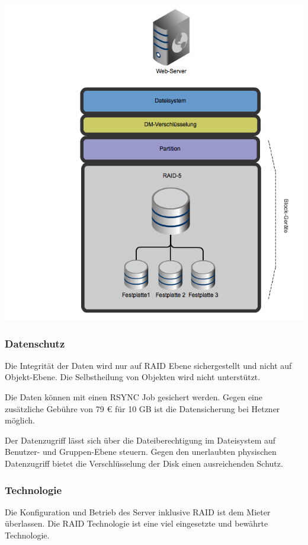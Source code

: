 \begin{center}
\includegraphics[width=\linewidth, keepaspectratio = true]{media/HetznerRAID.png}
\end{center}

\subsubsection*{Datenschutz}
Die Integrität der Daten wird nur auf RAID Ebene sichergestellt und nicht auf Objekt-Ebene. Die Selbstheilung von Objekten wird nicht unterstützt.

Die Daten können mit einen RSYNC Job gesichert werden. Gegen eine zusätzliche Gebühre von 79 € für 10 GB ist die Datensicherung bei Hetzner möglich.

Der Datenzugriff lässt sich über die Dateiberechtigung im Dateisystem auf Benutzer- und Gruppen-Ebene steuern. Gegen den unerlaubten physischen Datenzugriff bietet die Verschlüsselung der Disk einen ausreichenden Schutz.

\subsubsection*{Technologie}
Die Konfiguration und Betrieb des Server inklusive RAID ist dem Mieter überlassen. Die RAID Technologie ist eine viel eingesetzte und bewährte Technologie.

